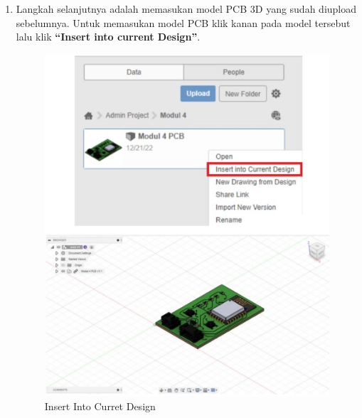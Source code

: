 \begin{enumerate}
    \item Langkah selanjutnya adalah memasukan model PCB 3D yang sudah diupload sebelumnya. Untuk
    memasukan model PCB klik kanan pada model tersebut lalu klik \textbf{“Insert into current Design”}.
        \begin{figure}[H]
            \centering
            \includegraphics[width=0.5\linewidth]{P3/img/image5.jpg}
            \caption{Insert Into Curret Design}
            \label{fig:Insert Into Curret Design}
        \end{figure}


\end{enumerate}
